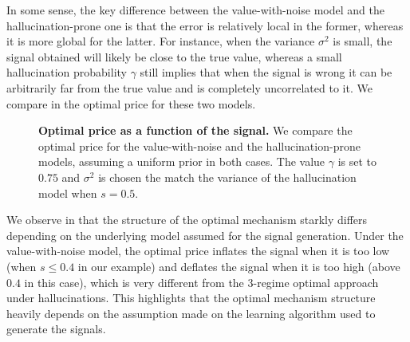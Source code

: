 In some sense, the key difference between the value-with-noise model and the hallucination-prone one is that the error is relatively local in the former, whereas it is more global for the latter. For instance, when the variance $\sigma^2$ is small, the signal obtained will likely be close to the true value, whereas a small hallucination probability $\gamma$ still implies that when the signal is wrong it can be arbitrarily far from the true value and is completely uncorrelated to it. We compare in  the optimal price for these two models.
\begin{figure}[h!]
    \centering
    \caption{\textbf{Optimal price as a function of the signal.} We compare the optimal price for the value-with-noise and the hallucination-prone models, assuming a uniform prior in both cases. The value $\gamma$ is set to $0.75$ and $\sigma^2$ is chosen the match the variance of the hallucination model when $s=0.5$.} 
    \label{fig:comparison_hall_noise}
\end{figure}

We  observe in  that the structure of the optimal mechanism starkly differs depending on the underlying model assumed for the signal generation. Under the value-with-noise model, the optimal price inflates the signal when it is too low (when $s \leq 0.4$ in our example) and deflates the signal when it is too high (above $0.4$ in this case), which is very different from the 3-regime optimal approach under hallucinations. This highlights that the optimal mechanism structure heavily depends on the assumption made on the learning algorithm used to generate the signals. 



